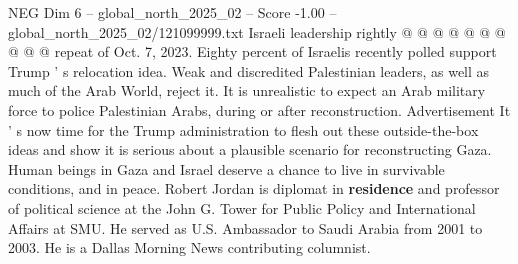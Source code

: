 \begin{textsample}{NEG Dim 6 – global\_north\_2025\_02 – Score -1.00 – global\_north\_2025\_02/121099999.txt}
Israeli leadership rightly @ @ @ @ @ @ @ @ @ @ repeat of Oct. 7, 2023.
Eighty percent of Israelis recently polled support Trump ' s relocation idea.
Weak and discredited Palestinian leaders, as well as much of the Arab World, reject it.
It is unrealistic to expect an Arab military force to police Palestinian Arabs, during or after reconstruction.
Advertisement It ' s now time for the Trump administration to flesh out these outside-the-box ideas and show it is serious about a plausible scenario for reconstructing Gaza.
Human beings in Gaza and Israel deserve a chance to live in survivable conditions, and in peace.
Robert Jordan is diplomat in \textbf{residence} and professor of political science at the John G.
Tower for Public Policy and International Affairs at SMU.
He served as U.S.
Ambassador to Saudi Arabia from 2001 to 2003.
He is a Dallas Morning News contributing columnist.

\end{textsample}
